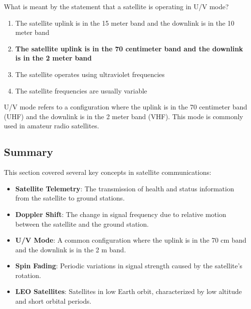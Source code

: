 \begin{tcolorbox}[colback=gray!10!white,colframe=black!75!black,title={T8B08}]
    What is meant by the statement that a satellite is operating in U/V mode?
    \begin{enumerate}[label=\Alph*,noitemsep]
        \item The satellite uplink is in the 15 meter band and the downlink is in the 10 meter band
        \item \textbf{The satellite uplink is in the 70 centimeter band and the downlink is in the 2 meter band}
        \item The satellite operates using ultraviolet frequencies
        \item The satellite frequencies are usually variable
    \end{enumerate}
\end{tcolorbox}
U/V mode refers to a configuration where the uplink is in the 70 centimeter band (UHF) and the downlink is in the 2 meter band (VHF). This mode is commonly used in amateur radio satellites.


\subsection*{Summary}
This section covered several key concepts in satellite communications:
\begin{itemize}
    \item \textbf{Satellite Telemetry}: The transmission of health and status information from the satellite to ground stations.
    \item \textbf{Doppler Shift}: The change in signal frequency due to relative motion between the satellite and the ground station.
    \item \textbf{U/V Mode}: A common configuration where the uplink is in the 70 cm band and the downlink is in the 2 m band.
    \item \textbf{Spin Fading}: Periodic variations in signal strength caused by the satellite's rotation.
    \item \textbf{LEO Satellites}: Satellites in low Earth orbit, characterized by low altitude and short orbital periods.
\end{itemize}
